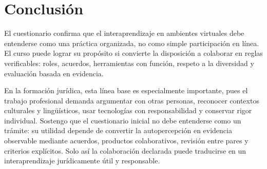 \documentclass[
  spanish,
  letterpaper, oneside
]{article}
\begin{document}


\section{Conclusión}

El cuestionario confirma que el interaprendizaje en ambientes virtuales debe
entenderse como una práctica organizada, no como simple participación en línea.
El curso puede lograr su propósito si convierte la disposición a colaborar en
reglas verificables: roles, acuerdos, herramientas con función, respeto a la
diversidad y evaluación basada en evidencia.

En la formación jurídica, esta línea base es especialmente importante, pues el
trabajo profesional demanda argumentar con otras personas, reconocer contextos
culturales y lingüísticos, usar tecnologías con responsabilidad y conservar rigor
individual. Sostengo que el cuestionario inicial no debe entenderse como un
trámite: su utilidad depende de convertir la autopercepción en evidencia
observable mediante acuerdos, productos colaborativos, revisión entre pares y
criterios explícitos. Solo así la colaboración declarada puede traducirse en un
interaprendizaje jurídicamente útil y responsable.

\clearpage
\nocite{unadmSitioWeb,unadmMallaDerecho2024,vygotsky1978mind,johnsonJohnson1999learning,unescoDigitalLiteracy2018,unescoInterculturalCompetences2013,unescoGenerativeAI2023,cpeum2026,leyDerechosLinguisticos2024}

\end{document}
